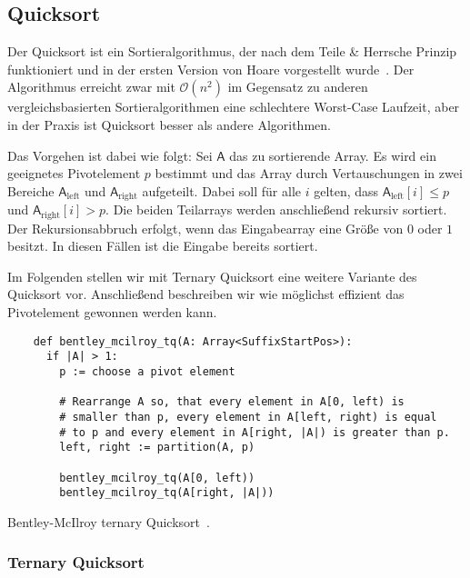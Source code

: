 \subsection{Quicksort}
\label{section:quicksort}

Der  Quicksort ist ein Sortieralgorithmus,
der nach dem Teile \& Herrsche Prinzip funktioniert und
in der ersten Version von Hoare vorgestellt wurde~\cite{quicksort}.
Der Algorithmus erreicht zwar mit $\mathcal O(n^2)$ im Gegensatz zu anderen
vergleichsbasierten Sortieralgorithmen eine schlechtere Worst-Case Laufzeit,
aber in der Praxis ist Quicksort besser als andere Algorithmen.

Das Vorgehen ist dabei wie folgt: Sei $\mathsf{A}$ das zu sortierende Array.
Es wird ein geeignetes Pivotelement $p$ bestimmt und das Array durch Vertauschungen in
zwei Bereiche $\mathsf{A}_{\text{left}}$ und $\mathsf{A}_{\text{right}}$ aufgeteilt.
Dabei soll für alle $i$ gelten, dass $\mathsf{A}_{\text{left}}[i] \le p$ und $\mathsf{A}_{\text{right}}[i] > p$.
Die beiden Teilarrays werden anschließend rekursiv sortiert.
Der Rekursionsabbruch erfolgt, wenn das Eingabearray eine Größe von $0$ oder $1$ besitzt.
In diesen Fällen ist die Eingabe bereits sortiert.

Im Folgenden stellen wir mit Ternary Quicksort eine weitere Variante des Quicksort vor.
Anschließend beschreiben wir wie möglichst effizient das Pivotelement gewonnen werden kann.

\begin{listing}[!h]
    \begin{verbatim}
    def bentley_mcilroy_tq(A: Array<SuffixStartPos>):
      if |A| > 1:
        p := choose a pivot element
    
        # Rearrange A so, that every element in A[0, left) is
        # smaller than p, every element in A[left, right) is equal
        # to p and every element in A[right, |A|) is greater than p.
        left, right := partition(A, p)
    
        bentley_mcilroy_tq(A[0, left))
        bentley_mcilroy_tq(A[right, |A|))
    \end{verbatim}
    \caption{Bentley-McIlroy ternary Quicksort~\cite{ternary_quicksort}.}
\end{listing}    

\subsubsection{Ternary Quicksort}
\label{section:ternary_quicksort}


